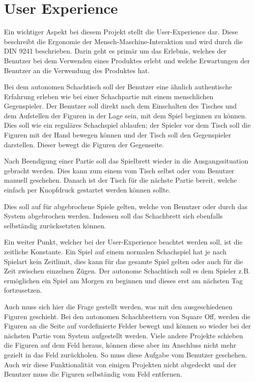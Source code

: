 \hypertarget{user-experience}{%
\section{User Experience}\label{user-experience}}

Ein wichtiger Aspekt bei diesem Projekt stellt die User-Experience dar.
Diese beschreibt die Ergonomie der Mensch-Maschine-Interaktion und wird
durch die DIN 9241\cite{din9241} beschrieben. Darin geht es primär
um das Erlebnis, welches der Benutzer bei dem Verwenden eines Produktes
erlebt und welche Erwartungen der Benutzer an die Verwendung des
Produktes hat.

Bei dem autonomen Schachtisch soll der Benutzer eine ähnlich
authentische Erfahrung erleben wie bei einer Schachpartie mit einem
menschlichen Gegenspieler. Der Benutzer soll direkt nach dem Einschalten
des Tisches und dem Aufstellen der Figuren in der Lage sein, mit dem
Spiel beginnen zu können. Dies soll wie ein reguläres Schachspiel
ablaufen; der Spieler vor dem Tisch soll die Figuren mit der Hand
bewegen können und der Tisch soll den Gegenspieler darstellen. Dieser
bewegt die Figuren der Gegenseite.

Nach Beendigung einer Partie soll das Spielbrett wieder in die
Ausgangssituation gebracht werden. Dies kann zum einem vom Tisch selbst
oder vom Benutzer manuell geschehen. Danach ist der Tisch für die
nächste Partie bereit, welche einfach per Knopfdruck gestartet werden
können sollte.

Dies soll auf für abgebrochene Spiele gelten, welche von Benutzer oder
durch das System abgebrochen werden. Indessen soll das Schachbrett sich
ebenfalls selbständig zurücksetzten können.

Ein weiter Punkt, welcher bei der User-Experience beachtet werden soll,
ist die zeitliche Konstante. Ein Spiel auf einem normalen Schachspiel
hat je nach Spielart kein Zeitlimit, dies kann für das gesamte Spiel
gelten oder auch für die Zeit zwischen einzelnen Zügen. Der autonome
Schachtisch soll es dem Spieler z.B. ermöglichen ein Spiel am Morgen zu
beginnen und dieses erst am nächsten Tag fortzusetzen.

Auch muss sich hier die Frage gestellt werden, was mit den
ausgeschiedenen Figuren geschieht. Bei den autonomen Schachbrettern von
Square Off\cite{squareoffgrand}, werden die Figuren an die Seite auf
vordefinierte Felder bewegt und können so wieder bei der nächsten Partie
vom System aufgestellt werden. Viele andere Projekte schieben die
Figuren auf dem Feld heraus, können diese aber im Anschluss nicht mehr
gezielt in das Feld zurückholen. So muss diese Aufgabe vom Benutzer
geschehen. Auch wir diese Funktionalität von einigen Projekten nicht
abgedeckt und der Benutzer muss die Figuren selbständig vom Feld
entfernen.

